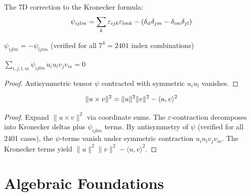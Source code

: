 \begin{definition}\label{def:psi}
    \leanok
    The 7D correction to the Kronecker formula:
    \[
        \psi_{ijlm} = \sum_k \varepsilon_{ijk}\varepsilon_{lmk} - (\delta_{il}\delta_{jm} - \delta_{im}\delta_{jl})
    \]
\end{definition}

\begin{lemma}\label{lem:psi_antisym_il}
    \leanok
    $\psi_{ijlm} = -\psi_{ljim}$
    (verified for all $7^4 = 2401$ index combinations)
\end{lemma}

\begin{lemma}\label{lem:psi_contract_vanishes}
    \leanok
    $\displaystyle\sum_{i,j,l,m} \psi_{ijlm} \, u_i u_l v_j v_m = 0$
\end{lemma}
\begin{proof}
    Antisymmetric tensor $\psi$ contracted with symmetric $u_i u_l$ vanishes.
\end{proof}

\begin{theorem}\label{thm:G2_cross_norm}
    \leanok
    \[
        \| u \times v \|^2 = \| u \|^2 \| v \|^2 - \langle u, v \rangle^2
    \]
\end{theorem}
\begin{proof}
    Expand $\|u \times v\|^2$ via coordinate sums. The $\varepsilon$-contraction
    decomposes into Kronecker deltas plus $\psi_{ijlm}$ terms. By antisymmetry
    of $\psi$ (verified for all 2401 cases), the $\psi$-terms vanish under
    symmetric contraction $u_i u_l v_j v_m$. The Kronecker terms yield
    $\|u\|^2 \|v\|^2 - \langle u,v \rangle^2$.
\end{proof}

\chapter{Algebraic Foundations}\label{chap:algebraic}

